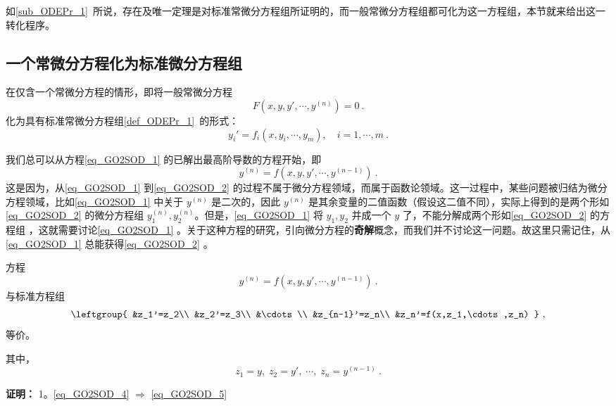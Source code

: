
如\autoref{sub_ODEPr_1}~所说，存在及唯一定理是对标准常微分方程组所证明的，而一般常微分方程组都可化为这一方程组，本节就来给出这一转化程序。

\subsection{一个常微分方程化为标准微分方程组}
在仅含一个常微分方程的情形，即将一般常微分方程
\begin{equation}\label{eq_GO2SOD_1}
F(x,y,y',\cdots,y^{(n)})=0~.
\end{equation}
化为具有标准常微分方程组\autoref{def_ODEPr_1}~的形式：
\begin{equation}\label{eq_GO2SOD_3}
y_i'=f_i(x,y_i,\cdots,y_m),\quad i=1,\cdots,m~.
\end{equation}

我们总可以从方程\autoref{eq_GO2SOD_1} 的已解出最高阶导数的方程开始，即
\begin{equation}\label{eq_GO2SOD_2}
y^{(n)}=f(x,y,y',\cdots,y^{(n-1)})~.
\end{equation}
这是因为，从\autoref{eq_GO2SOD_1} 到\autoref{eq_GO2SOD_2} 的过程不属于微分方程领域，而属于函数论领域。这一过程中，某些问题被归结为微分方程领域，比如\autoref{eq_GO2SOD_1} 中关于 $y^{(n)}$ 是二次的，因此 $y^{(n)}$ 是其余变量的二值函数（假设这二值不同），实际上得到的是两个形如\autoref{eq_GO2SOD_2} 的微分方程组 $y_1^{(n)},y_2^{(n)}$。但是，\autoref{eq_GO2SOD_1} 将 $y_1,y_2$ 并成一个 $y$ 了，不能分解成两个形如\autoref{eq_GO2SOD_2} 的方程组 ，这就需要讨论\autoref{eq_GO2SOD_1} 。关于这种方程的研究，引向微分方程的\textbf{奇解}概念，而我们并不讨论这一问题。故这里只需记住，从\autoref{eq_GO2SOD_1} 总能获得\autoref{eq_GO2SOD_2} 。
\begin{theorem}{}\label{the_GO2SOD_1}
方程
\begin{equation}\label{eq_GO2SOD_4}
y^{(n)}=f(x,y,y',\cdots,y^{(n-1)})~.
\end{equation}
与标准方程组
\begin{equation}\label{eq_GO2SOD_5}
\leftgroup{
&z_1'=z_2\\
&z_2'=z_3\\
&\cdots\\
&z_{n-1}'=z_n\\
&z_n'=f(x,z_1,\cdots,z_n)
}~,
\end{equation}
等价。

其中，
\begin{equation}\label{eq_GO2SOD_6}
z_1=y,\;z_2=y',\;\cdots,\;z_n=y^{(n-1)}~.
\end{equation}
\end{theorem}
\textbf{证明：}
1。\autoref{eq_GO2SOD_4} $\Rightarrow$ \autoref{eq_GO2SOD_5} 

